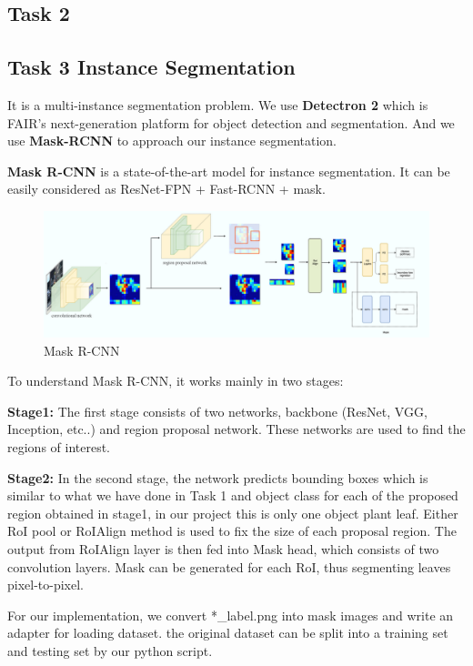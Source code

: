 \documentclass[conference]{IEEEtran}
\begin{document}
\subsection{Task 2}

\subsection{Task 3 Instance Segmentation}

It is a multi-instance segmentation problem. We use \textbf{Detectron 2}\cite{wu2019detectron2} which is FAIR's next-generation platform for object detection and segmentation. And we use \textbf{Mask-RCNN}\cite{He_2017} to approach our instance segmentation.

\textbf{Mask R-CNN} is a state-of-the-art model for instance segmentation. It can be easily considered as ResNet-FPN + Fast-RCNN + mask.

\begin{figure}[h!]
\centering
\includegraphics[width=\linewidth]{img/maskrcnn.png}
\caption{Mask R-CNN}
\label{fig_mask-rcnn}
\end{figure}

To understand Mask R-CNN, it works mainly in two stages:

\textbf{Stage1:} The first stage consists of two networks, backbone (ResNet, VGG, Inception, etc..) and region proposal network. These networks are used to find the regions of interest.

\textbf{Stage2:} In the second stage, the network predicts bounding boxes which is similar to what we have done in Task 1 and object class for each of the proposed region obtained in stage1, in our project this is only one object plant leaf. 
Either RoI pool or RoIAlign method is used to fix the size of each proposal region.
The output from RoIAlign layer is then fed into Mask head, which consists of two convolution layers.
Mask can be generated for each RoI, thus segmenting leaves pixel-to-pixel.

For our implementation, we convert *\_label.png into mask images and write an adapter for loading dataset.
the original dataset can be split into a training set and testing set by our python script.
\end{document}
